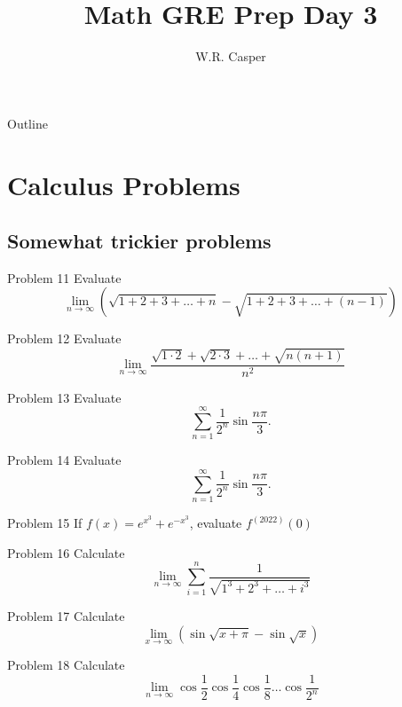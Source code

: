 \documentclass{beamer}
\title{Math GRE Prep Day 3}
\subtitle
{} %
\author[W.R. Casper] %
{W.R. Casper}
\institute[California State University Fullerton] %
{
  Department of Mathematics\\
  California State University Fullerton}
\begin{document}
\begin{frame}
  \titlepage
\end{frame}

\begin{frame}{Outline}
  \tableofcontents
\end{frame}



\section{Calculus Problems}

\subsection{Somewhat trickier problems}

\begin{frame}{Problem 11}
Evaluate
$$\lim_{n\rightarrow\infty}\left(\sqrt{1+2+3+\dots+n}-\sqrt{1+2+3+\dots+(n-1)}\right)$$
\end{frame}

\begin{frame}{Problem 12}
Evaluate
$$\lim_{n\rightarrow\infty}\frac{\sqrt{1\cdot 2} + \sqrt{2\cdot 3} + \dots + \sqrt{n(n+1)}}{n^2}$$
\end{frame}

\begin{frame}{Problem 13}
Evaluate
$$\sum_{n=1}^\infty\frac{1}{2^n}\sin\frac{n\pi}{3}.$$
\end{frame}

\begin{frame}{Problem 14}
Evaluate
$$\sum_{n=1}^\infty\frac{1}{2^n}\sin\frac{n\pi}{3}.$$
\end{frame}

\begin{frame}{Problem 15}
If $f(x) = e^{x^3} + e^{-x^3}$, evaluate $f^{(2022)}(0)$
\end{frame}

\begin{frame}{Problem 16}
Calculate
$$\lim_{n\rightarrow\infty}\sum_{i=1}^n\frac{1}{\sqrt{1^3+2^3+\dots+i^3}}$$
\end{frame}

\begin{frame}{Problem 17}
Calculate
$$\lim_{x\rightarrow\infty}\left(\sin\sqrt{x+\pi}-\sin\sqrt{x}\right)$$
\end{frame}

\begin{frame}{Problem 18}
Calculate
$$\lim_{n\rightarrow\infty}\cos\frac{1}{2}\cos\frac{1}{4}\cos\frac{1}{8}\dots\cos\frac{1}{2^n}$$
\end{frame}
\end{document}
